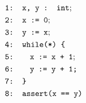 \documentclass{article}
\begin{document}
	\begin{minipage}{.3\textwidth}
	\centering
	\begin{align*}
	&\texttt{1: x, y : int}; \\
	&\texttt{2: x := 0}; \\
	&\texttt{3: y := x}; \\
	&\texttt{4: while(*) \{} \\
	&\texttt{5:} \hspace*{2em} \texttt{x := x + 1}; \\
	&\texttt{6:} \hspace*{2em} \texttt{y := y + 1;} \\
	&\texttt{7: \}} \\
	& \texttt{8: assert(x == y)}
	\end{align*}
	
	
	
	\label{fig:square}
\end{minipage}%
\hfill
\end{document}
